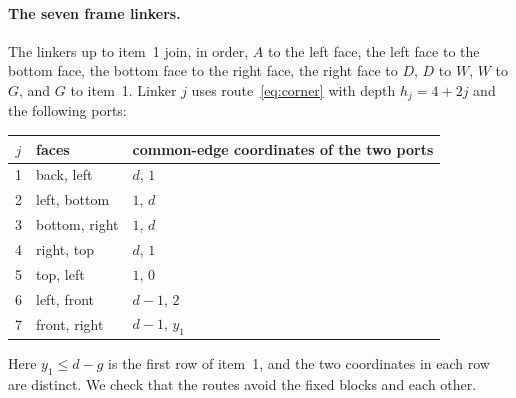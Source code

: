 \documentclass[11pt,letterpaper]{article}
\theoremstyle{definition}
\theoremstyle{remark}
\begin{document}
\paragraph{The seven frame linkers.}
The linkers up to item~1 join, in order, $A$ to the left face, the left face to the bottom face, the
bottom face to the right face, the right face to $D$, $D$ to $W$, $W$ to $G$, and $G$ to item~1. Linker
$j$ uses route~\eqref{eq:corner} with depth $h_j=4+2j$ and the following ports:
\begin{center}\small
\begin{tabular}{@{}cll@{}}
\toprule
$j$ & faces & common-edge coordinates of the two ports\\
\midrule
1 & back, left & $d$, $1$\\
2 & left, bottom & $1$, $d$\\
3 & bottom, right & $1$, $d$\\
4 & right, top & $d$, $1$\\
5 & top, left & $1$, $0$\\
6 & left, front & $d-1$, $2$\\
7 & front, right & $d-1$, $y_1$\\
\bottomrule
\end{tabular}
\end{center}
Here $y_1\le d-g$ is the first row of item~1, and the two coordinates in each row are distinct. We
check that the routes avoid the fixed blocks and each other.
\end{document}
